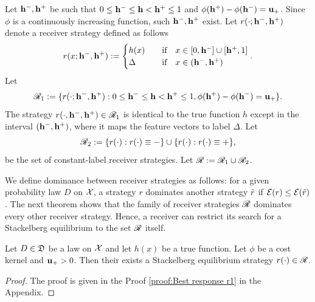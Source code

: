 Let $\mathbf{h^{-}},\mathbf{h^{+}}$ be such that $0 \leq \mathbf{h^{-}} \leq \mathbf{h} < \mathbf{h^{+}} \leq 1$ and $\phi(\mathbf{h^{+}}) - \phi(\mathbf{h^{-}}) = \mathbf{u_+}$. Since $\phi$ is a continuously increasing function, such $\mathbf{h^{-}}, \mathbf{h^{+}}$ exist. Let $r(\cdot;\mathbf{h^{-}},\mathbf{h^{+}})$ denote a receiver strategy defined as follows
	\begin{equation*}\label{eqn:simple strategies}
		r(x;\mathbf{h^{-}},\mathbf{h^{+}}) := \begin{cases}
			h(x) & \hbox{\quad if\quad} x \in [0,\mathbf{h^{-}}] \cup [\mathbf{h^{+}},1] \\
			\Delta & \hbox{\quad if\quad} x \in (\mathbf{h^{-}},\mathbf{h^{+}})
		\end{cases}.
	\end{equation*}
Let $$\mathscr{R}_1 := \{r(\cdot;\mathbf{h^{-}},\mathbf{h^{+}}): 0 \leq \mathbf{h^{-}} \leq \mathbf{h} < \mathbf{h^{+}} \leq 1, \phi(\mathbf{h^{+}}) - \phi(\mathbf{h^{-}}) = \mathbf{u_+}\}.$$
The strategy $r(\cdot,\mathbf{h^{-}},\mathbf{h^{+}}) \in \mathscr{R}_1$ is identical to the true function $h$ except in the interval $(\mathbf{h^{-}},\mathbf{h^{+}})$, where it maps the feature vectors to label $\Delta$.
Let$$\mathscr{R}_2 := \{r(\cdot): r(\cdot) \equiv \mathbf{-}\} \cup \{r(\cdot): r(\cdot) \equiv \mathbf{+}\},$$  be the set of constant-label receiver strategies. Let $\mathscr{R} := \mathscr{R}_1 \cup \mathscr{R}_2$.


We define dominance between receiver strategies as follows: for a given probability law $D$ on $\mathcal{X}$, a strategy $r$ dominates another strategy $\tilde{r}$ if $\mathcal{E}(r) \leq \mathcal{E}(\tilde{r})$. The next theorem shows that the family of receiver strategies $\mathscr{R}$ dominates every other receiver strategy. Hence, a receiver can restrict its search for a Stackelberg equilibrium to the set $\mathscr{R}$ itself.
\begin{thm}\label{thm:Deterministic Stackelberg equilibrium strategy} Let $D \in \mathfrak{D}$ be a law on $\mathcal{X}$ and let $h(x)$ be a true function. Let $\phi$ be a cost kernel and $\mathbf{u_+} > 0$. Then their exists a  Stackelberg equilibrium strategy $r(\cdot) \in \mathscr{R}$.
\end{thm}



\begin{proof} The proof is given in the Proof \ref{proof:Best response r1} in the Appendix.
\end{proof}



